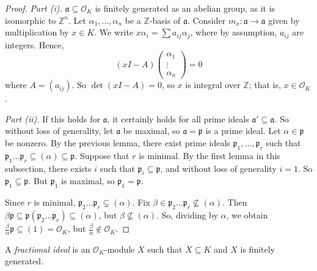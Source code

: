 \begin{proof}
    \emph{Part (i).}
    \( \mathfrak a \subseteq \mathcal O_K \) is finitely generated as an abelian group, as it is isomorphic to \( \mathbb Z^n \).
    Let \( \alpha_1, \dots, \alpha_n \) be a \( \mathbb Z \)-basis of \( \mathfrak a \).
    Consider \( m_x \colon \mathfrak a \to \mathfrak a \) given by multiplication by \( x \in K \).
    We write \( x \alpha_i = \sum a_{ij} \alpha_j \), where by assumption, \( a_{ij} \) are integers.
    Hence,
    \[ (xI - A) \begin{pmatrix}
        \alpha_1 \\
        \vdots \\
        \alpha_n
    \end{pmatrix} = 0 \]
    where \( A = (a_{ij}) \).
    So \( \det(xI - A) = 0 \), so \( x \) is integral over \( \mathbb Z \); that is, \( x \in \mathcal O_K \).

    \emph{Part (ii).}
    If this holds for \( \mathfrak a \), it certainly holds for all prime ideals \( \mathfrak a' \subseteq \mathfrak a \).
    So without loss of generality, let \( \mathfrak a \) be maximal, so \( \mathfrak a = \mathfrak p \) is a prime ideal.
    Let \( \alpha \in \mathfrak p \) be nonzero.
    By the previous lemma, there exist prime ideals \( \mathfrak p_1, \dots, \mathfrak p_r \) such that \( \mathfrak p_1 \dots \mathfrak p_r \subseteq (\alpha) \subseteq \mathfrak p \).
    Suppose that \( r \) is minimal.
    By the first lemma in this subsection, there exists \( i \) such that \( \mathfrak p_i \subseteq \mathfrak p \), and without loss of generality \( i = 1 \).
    So \( \mathfrak p_1 \subseteq \mathfrak p \).
    But \( \mathfrak p_1 \) is maximal, so \( \mathfrak p_1 = \mathfrak p \).

    Since \( r \) is minimal, \( \mathfrak p_2 \dots \mathfrak p_r \subsetneq (\alpha) \).
    Fix \( \beta \in \mathfrak p_2 \dots \mathfrak p_r \not\subseteq (\alpha) \).
    Then \( \beta \mathfrak p \subseteq \mathfrak p (\mathfrak p_2 \dots \mathfrak p_r) \subseteq (\alpha) \), but \( \beta \not\subseteq (\alpha) \).
    So, dividing by \( \alpha \), we obtain \( \frac{\beta}{\alpha} \mathfrak p \subseteq (1) = \mathcal O_K \), but \( \frac{\beta}{\alpha} \not\in \mathcal O_K \).
\end{proof}
\begin{definition}
    A \emph{fractional ideal} is an \( \mathcal O_K \)-module \( X \) such that \( X \subseteq K \) and \( X \) is finitely generated.
\end{definition}
